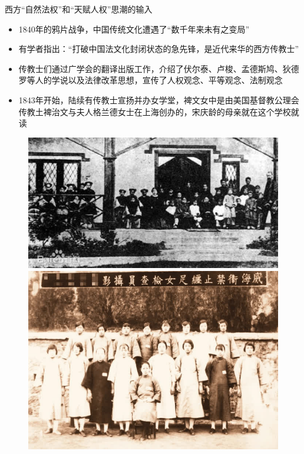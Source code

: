 \begin{frame}{西方“自然法权”和“天赋人权”思潮的输入}
    \begin{block}{}
        \begin{itemize}
            \item 1840年的鸦片战争，中国传统文化遭遇了“数千年来未有之变局”
            \item 有学者指出：“打破中国法文化封闭状态的急先锋，是近代来华的西方传教士”
            \item 传教士们通过广学会的翻译出版工作，介绍了伏尔泰、卢梭、孟德斯鸠、狄德罗等人的学说以及法律改革思想，宣传了人权观念、平等观念、法制观念
            \item 1843年开始，陆续有传教士宣扬并办女学堂，裨文女中是由美国基督教公理会传教土裨治文与夫人格兰德女士在上海创办的，宋庆龄的母亲就在这个学校就读
        \end{itemize}
    \end{block}
    \begin{figure}
        \centering
        \includegraphics[height=.4\textheight]{../docs/img/1-3.jpg}
        \includegraphics[height=.4\textheight]{../docs/img/1-5.jpg}
    \end{figure}
\end{frame}

